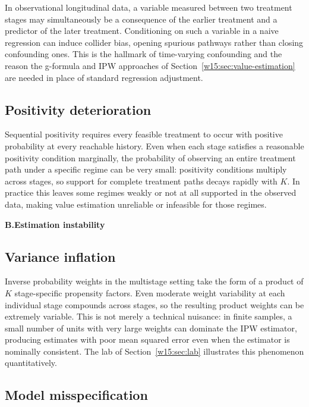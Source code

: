 \documentclass[master.tex]{subfiles}
\begin{document}
In observational longitudinal data, a variable measured between two treatment stages may simultaneously be a consequence of the earlier treatment and a predictor of the later treatment. Conditioning on such a variable in a naive regression can induce collider bias, opening spurious pathways rather than closing confounding ones. This is the hallmark of time-varying confounding and the reason the g-formula and IPW approaches of Section~\ref{w15:sec:value-estimation} are needed in place of standard regression adjustment.

\subsection{Positivity deterioration}

Sequential positivity requires every feasible treatment to occur with positive probability at every reachable history. Even when each stage satisfies a reasonable positivity condition marginally, the probability of observing an entire treatment path under a specific regime can be very small: positivity conditions multiply across stages, so support for complete treatment paths decays rapidly with $K$. In practice this leaves some regimes weakly or not at all supported in the observed data, making value estimation unreliable or infeasible for those regimes.

\medskip
\noindent\textbf{B.\enspace Estimation instability}
\medskip

\subsection{Variance inflation}

Inverse probability weights in the multistage setting take the form of a product of $K$ stage-specific propensity factors. Even moderate weight variability at each individual stage compounds across stages, so the resulting product weights can be extremely variable. This is not merely a technical nuisance: in finite samples, a small number of units with very large weights can dominate the IPW estimator, producing estimates with poor mean squared error even when the estimator is nominally consistent. The lab of Section~\ref{w15:sec:lab} illustrates this phenomenon quantitatively.

\subsection{Model misspecification}
\end{document}

